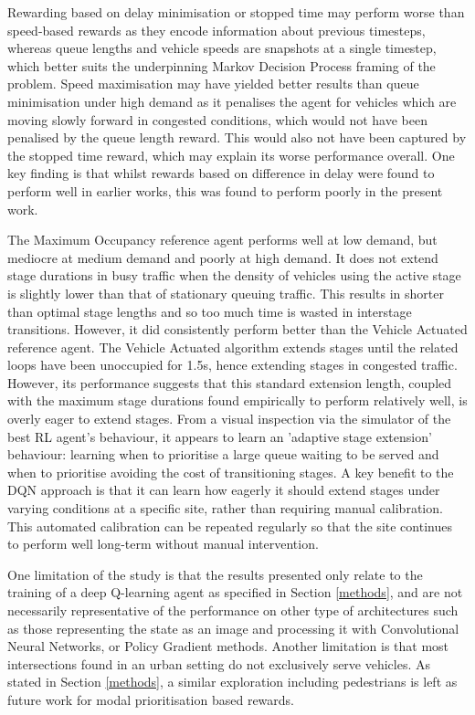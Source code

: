 \documentclass[conference]{IEEEtran}
\begin{document}
Rewarding based on delay minimisation or stopped time may perform worse than speed-based rewards as they encode information about previous timesteps, whereas queue lengths and vehicle speeds are snapshots at a single timestep, which better suits the underpinning Markov Decision Process framing of the problem.
Speed maximisation may have yielded better results than queue minimisation under high demand as it penalises the agent for vehicles which are moving slowly forward in congested conditions, which would not have been penalised by the queue length reward.
This would also not have been captured by the stopped time reward, which may explain its worse performance overall. One key finding is that whilst rewards based on difference in delay were found to perform well in earlier works, this was found to perform poorly in the present work.

The Maximum Occupancy reference agent performs well at low demand, but mediocre at medium demand and poorly at high demand.
It does not extend stage durations in busy traffic when the density of vehicles using the active stage is slightly lower than that of stationary queuing traffic.
This results in shorter than optimal stage lengths and so too much time is wasted in interstage transitions.
However, it did consistently perform better than the Vehicle Actuated reference agent.
The Vehicle Actuated algorithm extends stages until the related loops have been unoccupied for 1.5s, hence extending stages in congested traffic.
However, its performance suggests that this standard extension length, coupled with the maximum stage durations found empirically to perform relatively well, is overly eager to extend stages.
From a visual inspection via the simulator of the best RL agent's behaviour, it appears to learn an 'adaptive stage extension' behaviour: learning when to prioritise a large queue waiting to be served and when to prioritise avoiding the cost of transitioning stages.
A key benefit to the DQN approach is that it can learn how eagerly it should extend stages under varying conditions at a specific site, rather than requiring manual calibration.
This automated calibration can be repeated regularly so that the site continues to perform well long-term without manual intervention.

One limitation of the study is that the results presented only relate to the training of a deep Q-learning agent as specified in Section \ref{methods}, and are not necessarily representative of the performance on other type of architectures such as those representing the state as an image and processing it with Convolutional Neural Networks, or Policy Gradient methods.
Another limitation is that most intersections found in an urban setting do not exclusively serve vehicles. As stated in Section \ref{methods}, a similar exploration including pedestrians is left as future work for modal prioritisation based rewards.
\end{document}
